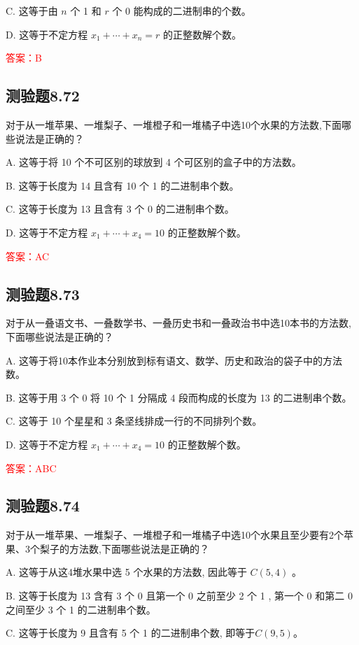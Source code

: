 \documentclass[UTF8, heading=true]{ctexart}
\begin{document}
C. 这等于由 $n$ 个 1 和 $r$ 个 0 能构成的二进制串的个数。

D. 这等于不定方程 $x_1+\cdots+x_n=r$ 的正整数解个数。

\textcolor{red}{答案：B}

\subsection{测验题8.72}

对于从一堆苹果、一堆梨子、一堆橙子和一堆橘子中选10个水果的方法数,下面哪些说法是正确的？

A. 这等于将 10 个不可区别的球放到 4 个可区别的盒子中的方法数。

B. 这等于长度为 14 且含有 10 个 1 的二进制串个数。

C. 这等于长度为 13 且含有 3 个 0 的二进制串个数。

D. 这等于不定方程 $x_1+\cdots+x_4=10$ 的正整数解个数。

\textcolor{red}{答案：AC}

\subsection{测验题8.73}

对于从一叠语文书、一叠数学书、一叠历史书和一叠政治书中选10本书的方法数,下面哪些说法是正确的？

A. 这等于将10本作业本分别放到标有语文、数学、历史和政治的袋子中的方法数。

B. 这等于用 3 个 0 将 10 个 1 分隔成 4 段而构成的长度为 13 的二进制串个数。

C. 这等于 10 个星星和 3 条坚线排成一行的不同排列个数。

D. 这等于不定方程 $x_1+\cdots+x_4=10$ 的正整数解个数。

\textcolor{red}{答案：ABC}

\subsection{测验题8.74}

对于从一堆苹果、一堆梨子、一堆橙子和一堆橘子中选10个水果且至少要有2个苹果、3个梨子的方法数,下面哪些说法是正确的？

A. 这等于从这4堆水果中选 5 个水果的方法数, 因此等于 $C(5,4)$ 。

B. 这等于长度为 13 含有 3 个 0 且第一个 0 之前至少 2 个 1 , 第一个 0 和第二 0 之间至少 3 个 1 的二进制串个数。

C. 这等于长度为 9 且含有 5 个 1 的二进制串个数, 即等于$C(9,5)$。
\end{document}

